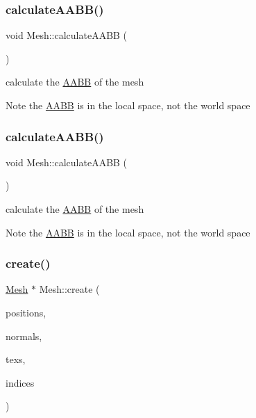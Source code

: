 \subsubsection{\texorpdfstring{calculate\+A\+A\+B\+B()}{calculateAABB()}\hspace{0.1cm}{\footnotesize\ttfamily [1/2]}}
{\footnotesize\ttfamily void Mesh\+::calculate\+A\+A\+BB (\begin{DoxyParamCaption}{ }\end{DoxyParamCaption})}

calculate the \hyperlink{classAABB}{A\+A\+BB} of the mesh \begin{DoxyNote}{Note}
the \hyperlink{classAABB}{A\+A\+BB} is in the local space, not the world space 
\end{DoxyNote}
\mbox{\label{classMesh_aceba31e4566e9369d03a169c3742eb0f}} 
\subsubsection{\texorpdfstring{calculate\+A\+A\+B\+B()}{calculateAABB()}\hspace{0.1cm}{\footnotesize\ttfamily [2/2]}}
{\footnotesize\ttfamily void Mesh\+::calculate\+A\+A\+BB (\begin{DoxyParamCaption}{ }\end{DoxyParamCaption})}

calculate the \hyperlink{classAABB}{A\+A\+BB} of the mesh \begin{DoxyNote}{Note}
the \hyperlink{classAABB}{A\+A\+BB} is in the local space, not the world space 
\end{DoxyNote}
\mbox{\label{classMesh_af6f521945ac85456827b7152f594d418}} 
\subsubsection{\texorpdfstring{create()}{create()}\hspace{0.1cm}{\footnotesize\ttfamily [1/8]}}
{\footnotesize\ttfamily \hyperlink{classMesh}{Mesh} $\ast$ Mesh\+::create (\begin{DoxyParamCaption}\item[{const std\+::vector$<$ float $>$ \&}]{positions,  }\item[{const std\+::vector$<$ float $>$ \&}]{normals,  }\item[{const std\+::vector$<$ float $>$ \&}]{texs,  }\item[{const Index\+Array \&}]{indices }\end{DoxyParamCaption})\hspace{0.3cm}{\ttfamily [static]}}

